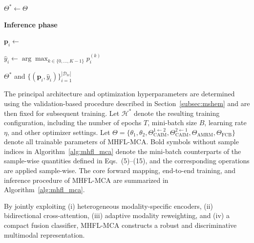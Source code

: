 \documentclass[a4paper]{cas-sc}
\begin{document}
\begin{algorithm}[!htbp]
\begin{algorithmic}[1]
    \EndFor

\EndFor

\State $\Theta^{\ast}\gets\Theta$

\Statex
\Statex \textbf{Inference phase}


    \State $\mathbf{p}_{i}
    \gets$

    \State $\hat{y}_{i}
    \gets
    \arg\max_{k\in\{0,\ldots,K-1\}}
    p_{i}^{(k)}$

\EndFor

\State \Return $\Theta^{\ast}$ and
$\{(\mathbf{p}_{i},\hat{y}_{i})\}_{i=1}^{|\mathcal{D}_{\mathrm{te}}|}$

\end{algorithmic}
\end{algorithm}

The principal architecture and optimization hyperparameters are
determined using the validation-based procedure described in
Section~\ref{subsec:mshem} and are then fixed for subsequent training. Let $\mathcal{H}^{\ast}$ denote the resulting training configuration, including the number of epochs $T$, mini-batch size $B$, learning rate $\eta$, and other optimizer settings. Let $\Theta=\{\theta_{1},\theta_{2},
\Theta_{\mathrm{CAIM}}^{1\leftarrow2},
\Theta_{\mathrm{CAIM}}^{2\leftarrow1},
\Theta_{\mathrm{AMRM}},\Theta_{\mathrm{FCB}}\}$
denote all trainable parameters of MHFL-MCA. Bold symbols without sample indices in Algorithm~\ref{alg:mhfl_mca} denote the mini-batch counterparts of the sample-wise quantities defined in Eqs.~(5)--(15), and the corresponding operations are applied sample-wise. The core forward mapping, end-to-end training, and inference procedure of MHFL-MCA are summarized in
Algorithm~\ref{alg:mhfl_mca}.


By jointly exploiting (i) heterogeneous modality-specific
encoders, (ii) bidirectional cross-attention, (iii) adaptive
modality reweighting, and (iv) a compact fusion classifier,
MHFL-MCA constructs a robust and discriminative multimodal
representation.
\end{document}
